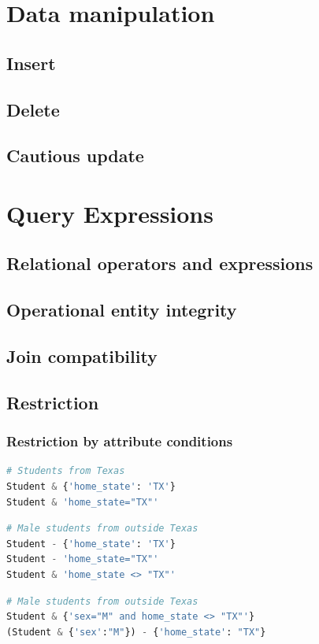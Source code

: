 \documentclass[letter,10pt]{article}
\begin{document}
\section{Data manipulation}\label{sec:manip}
\subsection{Insert}
\subsection{Delete}
\subsection{Cautious update}

\section{Query Expressions}\label{sec:query}
\subsection{Relational operators and expressions}
\subsection{Operational entity integrity}
\subsection{Join compatibility}
\subsection{Restriction}
\subsubsection{Restriction by attribute conditions}
\begin{lstlisting}[language=python, frame=None]
# Students from Texas
Student & {'home_state': 'TX'}
Student & 'home_state="TX"'
\end{lstlisting}

\begin{lstlisting}[language=python, frame=None]
# Male students from outside Texas
Student - {'home_state': 'TX'}
Student - 'home_state="TX"'
Student & 'home_state <> "TX"'
\end{lstlisting}

\begin{lstlisting}[language=python, frame=None]
# Male students from outside Texas
Student & {'sex="M" and home_state <> "TX"'}
(Student & {'sex':"M"}) - {'home_state': "TX"}
\end{lstlisting}
\end{document}
